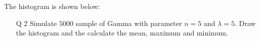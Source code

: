 \documentclass[12pt]{book}
\begin{document}
\newpage
The histogram is shown below:
\begin{figure}[H]
	\centering
\end{figure}
\newpage

\begin{enumerate}
\item[Q 2] Simulate $5000$ sample of Gamma with parameter $n=5$ and $\lambda=5$. Draw the histogram and the calculate the mean, maximum and minimum.
\end{enumerate}
\end{document}
